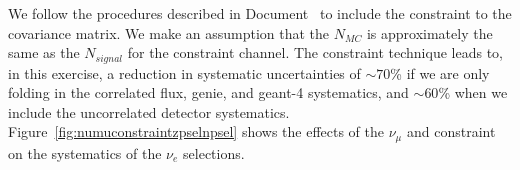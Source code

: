 \par We follow the procedures described in Document~\cite{bib:muonconstraint} to include the %
\numu constraint to the covariance matrix. We make an assumption that the $N_{MC}$ is approximately the same as the $N_{signal}$ for the constraint channel. The constraint technique leads to, in this exercise, a reduction in systematic uncertainties of $\sim70$\% if we are only folding in the correlated flux, genie, and geant-4 systematics, and $\sim60$\% when we include the uncorrelated detector systematics.
Figure~\ref{fig:numuconstraintzpselnpsel} shows the effects of the $\nu_\mu$ and \zpsel constraint on the systematics of the \npsel $\nu_e$ selections.

